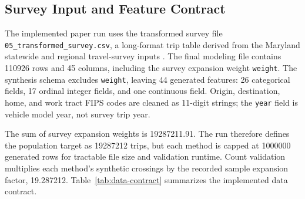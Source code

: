 \documentclass[3p,times,procedia]{elsarticle}
\begin{document}
\subsection{Survey Input and Feature Contract}
The implemented paper run uses the transformed survey file \texttt{05\_transformed\_survey.csv}, a long-format trip table derived from the Maryland statewide and regional travel-survey inputs \cite{bmc2019mts,mwcog2018rts}. The final modeling file contains \num{110926} rows and \num{45} columns, including the survey expansion weight \texttt{weight}. The synthesis schema excludes \texttt{weight}, leaving \num{44} generated features: \num{26} categorical fields, \num{17} ordinal integer fields, and one continuous field. Origin, destination, home, and work tract FIPS codes are cleaned as 11-digit strings; the \texttt{year} field is vehicle model year, not survey trip year.

The sum of survey expansion weights is \num{19287211.91}. The run therefore defines the population target as \num{19287212} trips, but each method is capped at \num{1000000} generated rows for tractable file size and validation runtime. Count validation multiplies each method's synthetic crossings by the recorded sample expansion factor, \num{19.287212}. Table~\ref{tab:data-contract} summarizes the implemented data contract.
\end{document}
